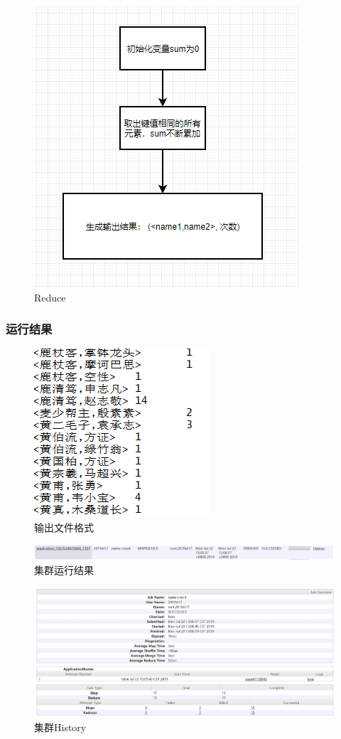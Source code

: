 \documentclass{ctexart}
\begin{document}
\begin{figure}[H]
\begin{minipage}[t]{0.6\textwidth}
			\includegraphics[width=0.9\linewidth]{pic/task2/reduce}
			\caption{Reduce}
			\label{fig:reduce}
		\end{minipage}
	\end{figure}

	\subsubsection{运行结果}
	\begin{figure}[H]
		\centering
		\includegraphics[width=0.3\linewidth]{pic/task2/result}
		\caption{输出文件格式}
	\end{figure}
	\begin{figure}[H]
	\centering
	\includegraphics[width=0.8\linewidth]{pic/webui/task2}
	\caption{集群运行结果}
	\end{figure}
	\begin{figure}[H]
	\centering
	\includegraphics[width=0.8\linewidth]{pic/webui/task2_job}
	\caption{集群History}
	\end{figure}
	
\end{document}

